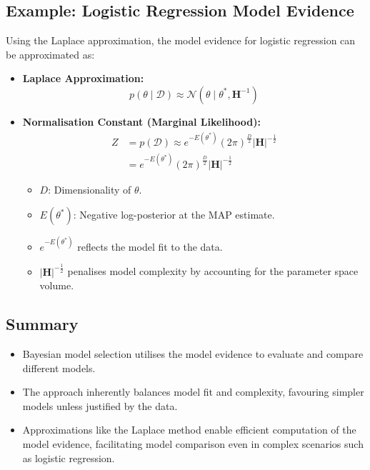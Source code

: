 \subsection{Example: Logistic Regression Model Evidence}

Using the Laplace approximation, the model evidence for logistic regression can be approximated as:

\begin{itemize}
    \item \textbf{Laplace Approximation:}
    \[
    p(\theta \mid \mathcal{D}) \approx \mathcal{N}(\theta \mid \theta^*, \mathbf{H}^{-1})
    \]
    \item \textbf{Normalisation Constant (Marginal Likelihood):}
    \begin{align*}
        Z &= p(\mathcal{D}) \approx e^{-E(\theta^*)} (2\pi)^{\frac{D}{2}} |\mathbf{H}|^{-\frac{1}{2}} \\
        &= e^{-E(\theta^*)} (2\pi)^{\frac{D}{2}} \left|\mathbf{H}\right|^{-\frac{1}{2}}
    \end{align*}
    \begin{itemize}
        \item $D$: Dimensionality of $\theta$.
        \item $E(\theta^*)$: Negative log-posterior at the MAP estimate.
    \end{itemize}

    \begin{itemize}
        \item $e^{-E(\theta^*)}$ reflects the model fit to the data.
        \item $|\mathbf{H}|^{-\frac{1}{2}}$ penalises model complexity by accounting for the parameter space volume.
    \end{itemize}
\end{itemize}

\subsection{Summary}

\begin{itemize}
    \item Bayesian model selection utilises the model evidence to evaluate and compare different models.
    \item The approach inherently balances model fit and complexity, favouring simpler models unless justified by the data.
    \item Approximations like the Laplace method enable efficient computation of the model evidence, facilitating model comparison even in complex scenarios such as logistic regression.
\end{itemize}

